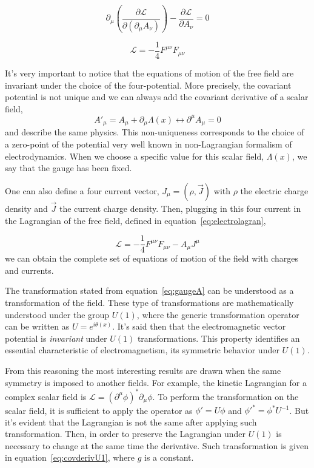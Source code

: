\begin{equation}
  \label{eq:electromotion}
  \partial_{\mu}\left( \frac{\partial \mathcal{L}}{\partial (\partial_{\mu}A_{\nu})} \right) -\frac{\partial \mathcal{L}}{\partial A_{\nu}}=0
\end{equation}

\begin{equation}
  \label{eq:electrolagran}
  \mathcal{L}=-\frac{1}{4}F^{\mu\nu}F_{\mu\nu}
\end{equation}

It's very important to notice that the equations of motion of the free field are invariant under the choice of the four-potential. More precisely, the covariant potential is not unique and we can always add the covariant derivative of a scalar field, 
\begin{equation}
  \label{eq:gaugeA}
  {A'}_{\mu}=A_{\mu}+\partial_{\mu}\Lambda(x) \leftrightarrow \partial^{\mu}A_{\mu}=0
\end{equation} and describe the same physics. This non-uniqueness corresponds to the choice of a zero-point of the potential very well known in non-Lagrangian formalism of electrodynamics. When we choose a specific value for this scalar field, $\Lambda(x)$, we say that the gauge has been fixed. 

One can also define a four current vector, $J_{\mu}=\left( \rho,\vec{J} \right)$ with $\rho$ the electric charge density and $\vec{J}$ the current charge density. Then, plugging in this four current in the Lagrangian of the free field, defined in equation~\ref{eq:electrolagran}, 

\begin{equation}
  \label{eq:fulleleclagrangian}
  \mathcal{L}=-\frac{1}{4}F^{\mu\nu}F_{\mu\nu}-A_{\mu}J^{\mu}
\end{equation}we can obtain the complete set of equations of motion of the field with charges and currents. 

The transformation stated from equation~\ref{eq:gaugeA} can be understood as a transformation of the field. These type of transformations are mathematically understood under the group $U(1)$, where the generic transformation operator can be written as $U=e^{i\theta(x)}$. It's said then that the electromagnetic vector potential is \textit{invariant} under $U(1)$ transformations. This property identifies an essential characteristic of electromagnetism, its symmetric behavior under $U(1)$. 

From this reasoning the most interesting results are drawn when the same symmetry is imposed to another fields. For example, the kinetic Lagrangian for a complex scalar field is $\mathcal{L}=(\partial^{\mu}\phi)^{*}\partial_{\mu}\phi$. To perform the transformation on the scalar field, it is sufficient to apply the operator as $\phi'=U\phi$ and ${\phi'}^{*}={\phi}^{*} U^{-1}$. But it's evident that the Lagrangian is not the same after applying such transformation. Then, in order to preserve the Lagrangian under $U(1)$ is necessary to change at the same time the derivative. Such transformation is given in equation~\ref{eq:covderivU1}, where $g$ is a constant.


